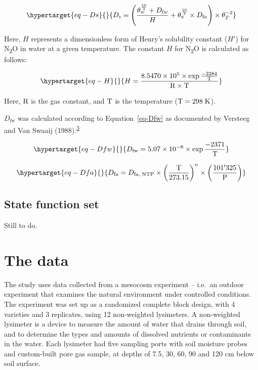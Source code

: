 \documentclass[
]{article}
\begin{document}
\begin{equation}\protect\hypertarget{eq-Ds}{}{D_{\text s} = \left( \frac{\theta_w^{\frac{10}{3}} + D_{\text fw}}{H} + \theta_a^{\frac{10}{3}} \times D_{\text fa} \right) \times \theta_T^{-2}}\label{eq-Ds}\end{equation}

Here, \(H\) represents a dimensionless form of Henry's solubility
constant (\(H'\)) for N\textsubscript{2}O in water at a given
temperature. The constant \(H\) for N\textsubscript{2}O is calculated as
follows:

\begin{equation}\protect\hypertarget{eq-H}{}{H = \frac{8.5470 \times 10^5 \times \exp \frac{-2284}{\text T}}{\text R \times \text T}}\label{eq-H}\end{equation}

Here, \(\text R\) is the gas constant, and \(\text T\) is the
temperature (\(\text T = 298 \; \text K\)).

\(D_{\text{fw}}\) was calculated according to Equation~\ref{eq-Dfw} as
documented by Versteeg and Van Swaaij
(1988).\textsuperscript{\protect\hyperlink{ref-versteeg1988solubility}{3}}

\begin{equation}\protect\hypertarget{eq-Dfw}{}{D_{\text{fw}} = 5.07 \times 10^{-6} \times \exp \frac{-2371}{\text T}}\label{eq-Dfw}\end{equation}

\begin{equation}\protect\hypertarget{eq-Dfa}{}{D_{\text{fa}} = D_{\text{fa, NTP}} \times \left( \frac{\text T}{273.15} \right)^n \times \left( \frac{101'325}{\text P} \right)}\label{eq-Dfa}\end{equation}

\hypertarget{state-function-set}{%
\subsection{State function set}\label{state-function-set}}

Still to do.

\hypertarget{the-data}{%
\section{The data}\label{the-data}}

The study uses data collected from a mesocosm experiment -- i.e.~an
outdoor experiment that examines the natural environment under
controlled conditions. The experiment was set up as a randomized
complete block design, with 4 varieties and 3 replicates, using 12
non-weighted lysimeters. A non-weighted lysimeter is a device to measure
the amount of water that drains through soil, and to determine the types
and amounts of dissolved nutrients or contaminants in the water. Each
lysimeter had five sampling ports with soil moisture probes and
custom-built pore gas sample, at depths of 7.5, 30, 60, 90 and 120 cm
below soil surface.
\end{document}
